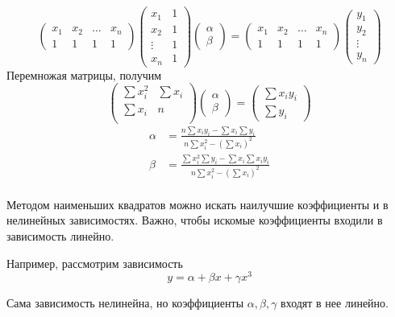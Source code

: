 \documentclass[professionalfonts,compress,unicode]{beamer}
\begin{document}
{
	$$
	\begin{pmatrix}
		x_1&x_2&\dots&x_n\\
		1&1&1&1
	\end{pmatrix}	
	\begin{pmatrix}
		x_1&1\\
		x_2&1\\
		\vdots&1\\
		x_n&1
	\end{pmatrix}
	\begin{pmatrix}
		\alpha\\\beta
	\end{pmatrix} = 
	\begin{pmatrix}
		x_1&x_2&\dots&x_n\\
		1&1&1&1
	\end{pmatrix}		
	\begin{pmatrix}
		y_1\\y_2\\\vdots\\y_n
	\end{pmatrix}
	$$	
	Перемножая матрицы, получим
	$$
	\begin{pmatrix}
		\sum x_i^2&\sum x_i\\
		\sum x_i&n\\
	\end{pmatrix}
	\begin{pmatrix}
		\alpha\\\beta
	\end{pmatrix} =
	\begin{pmatrix}
		\sum x_i y_i\\
		\sum y_i
	\end{pmatrix}
	$$
	\begin{align*}
		\alpha &= \frac{n \sum x_i y_i - \sum x_i \sum y_i}
		{n \sum x_i^2 - \left(\sum x_i\right)^2}\\
		\beta &= \frac{\sum x_i^2 \sum y_i - \sum x_i \sum x_i y_i}
		{n \sum x_i^2 - \left(\sum x_i\right)^2}\\
	\end{align*}
}

{
	Методом наименьших квадратов можно искать наилучшие коэффициенты 
	и в нелинейных зависимостях. Важно, чтобы искомые коэффициенты входили
	в зависимость линейно.

	Например, рассмотрим зависимость
	$$
	y = \alpha + \beta x + \gamma x^3
	$$

	Сама зависимость нелинейна, но коэффициенты $\alpha, \beta, \gamma$ входят 
	в нее линейно.
}
\end{document}
